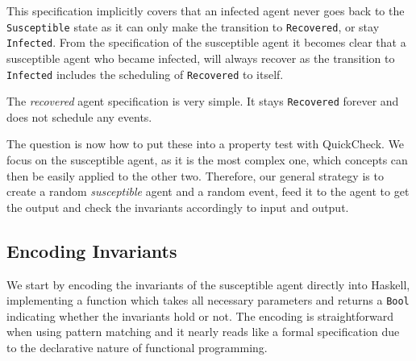 This specification implicitly covers that an infected agent never goes back to the \texttt{Susceptible} state as it can only make the transition to \texttt{Recovered}, or stay \texttt{Infected}. From the specification of the susceptible agent it becomes clear that a susceptible agent who became infected, will always recover as the transition to \texttt{Infected} includes the scheduling of \texttt{Recovered} to itself. 

\medskip

The \textit{recovered} agent specification is very simple. It stays \texttt{Recovered} forever and does not schedule any events.

\medskip

The question is now how to put these into a property test with QuickCheck. We focus on the susceptible agent, as it is the most complex one, which concepts can then be easily applied to the other two. Therefore, our general strategy is to create a random \textit{susceptible} agent and a random event, feed it to the agent to get the output and check the invariants accordingly to input and output. %

\subsection{Encoding Invariants}
We start by encoding the invariants of the susceptible agent directly into Haskell, implementing a function which takes all necessary parameters and returns a \texttt{Bool} indicating whether the invariants hold or not. The encoding is straightforward when using pattern matching and it nearly reads like a formal specification due to the declarative nature of functional programming.

